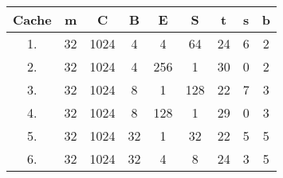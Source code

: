 \documentclass{article}
\begin{document}
\begin{tabular}{c c c c c c c c c}
	Cache & m & C & B & E & S & t & s & b \\
	\hline
	1. & 32 & 1024 & 4 & 4 & 64 & 24 & 6 & 2 \\
	2. & 32 & 1024 & 4 & 256 & 1 & 30 & 0 & 2 \\
	3. & 32 & 1024 & 8 & 1 & 128 & 22 & 7 & 3 \\
	4. & 32 & 1024 & 8 & 128 & 1 & 29 & 0 & 3 \\
	5. & 32 & 1024 & 32 & 1 & 32 & 22 & 5 & 5 \\
	6. & 32 & 1024 & 32 & 4 & 8 & 24 & 3 & 5 \\
\end{tabular}
\end{document}
